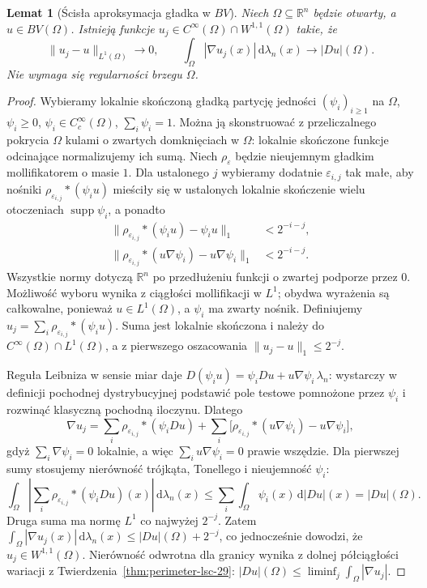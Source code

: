 \documentclass[11pt,a4paper,oneside]{book}
\numberwithin{equation}{chapter}
\theoremstyle{plain}
\newtheorem{lemat}[twierdzenie]{Lemat}
\theoremstyle{definition}
\theoremstyle{remark}
\begin{document}
\begin{lemat}[Ścisła aproksymacja gładka w $BV$]
\label{lem:BV-strict-approx}
Niech $\Omega\subseteq\mathbb R^n$ będzie otwarty,
a $u\in BV(\Omega)$. Istnieją funkcje
$u_j\in C^\infty(\Omega)\cap W^{1,1}(\Omega)$ takie, że
\[
 \|u_j-u\|_{L^1(\Omega)}\longrightarrow0,
 \qquad
 \int_\Omega|\nabla u_j(x)|\,\mathrm d\lambda_n(x)
 \longrightarrow |Du|(\Omega).
\]
Nie wymaga się regularności brzegu $\Omega$.
\end{lemat}
\begin{proof}
Wybieramy lokalnie skończoną gładką partycję
jedności $(\psi_i)_{i\ge1}$ na $\Omega$,
$\psi_i\ge0$, $\psi_i\in C_c^\infty(\Omega)$,
$\sum_i\psi_i=1$. Można ją skonstruować z
przeliczalnego pokrycia $\Omega$ kulami o zwartych
domknięciach w $\Omega$: lokalnie skończone
funkcje odcinające normalizujemy ich sumą.
Niech $\rho_\varepsilon$ będzie nieujemnym
gładkim mollifikatorem o masie $1$.
Dla ustalonego $j$ wybieramy dodatnie
$\varepsilon_{i,j}$ tak małe, aby nośniki
$\rho_{\varepsilon_{i,j}}*(\psi_i u)$ mieściły
się w ustalonych lokalnie skończenie wielu
otoczeniach $\operatorname{supp}\psi_i$,
a ponadto
\begin{align*}
 \|\rho_{\varepsilon_{i,j}}*(\psi_i u)-\psi_i u\|_1
 &<2^{-i-j},\\
 \|\rho_{\varepsilon_{i,j}}*(u\nabla\psi_i)
              -u\nabla\psi_i\|_1
 &<2^{-i-j}.
\end{align*}
Wszystkie normy dotyczą $\mathbb R^n$ po
przedłużeniu funkcji o zwartej podporze przez $0$.
Możliwość wyboru wynika z ciągłości mollifikacji
w $L^1$; obydwa wyrażenia są całkowalne, ponieważ
$u\in L^1(\Omega)$, a $\psi_i$ ma zwarty nośnik.
Definiujemy
$u_j=\sum_i\rho_{\varepsilon_{i,j}}*(\psi_i u)$.
Suma jest lokalnie skończona i należy do
$C^\infty(\Omega)\cap L^1(\Omega)$, a z pierwszego
oszacowania
$\|u_j-u\|_1\le2^{-j}$.

Reguła Leibniza w sensie miar daje
$D(\psi_i u)=\psi_i Du+u\nabla\psi_i\,\lambda_n$:
wystarczy w definicji pochodnej dystrybucyjnej
podstawić pole testowe pomnożone przez $\psi_i$
i rozwinąć klasyczną pochodną iloczynu.
Dlatego
\[
 \nabla u_j
 =\sum_i\rho_{\varepsilon_{i,j}}*(\psi_i Du)
 +\sum_i\bigl[\rho_{\varepsilon_{i,j}}*(u\nabla\psi_i)
                  -u\nabla\psi_i\bigr],
\]
gdyż $\sum_i\nabla\psi_i=0$ lokalnie,
a więc $\sum_i u\nabla\psi_i=0$ prawie wszędzie.
Dla pierwszej sumy stosujemy nierówność trójkąta,
Tonellego i nieujemność $\psi_i$:
\[
 \int_\Omega\left|
 \sum_i\rho_{\varepsilon_{i,j}}*(\psi_i Du)(x)
 \right|\,\mathrm d\lambda_n(x)
 \le\sum_i\int_\Omega\psi_i(x)\,\mathrm d|Du|(x)
 =|Du|(\Omega).
\]
Druga suma ma normę $L^1$ co najwyżej $2^{-j}$.
Zatem $\int_\Omega|\nabla u_j(x)|\,\mathrm d\lambda_n(x)
\le|Du|(\Omega)+2^{-j}$, co jednocześnie dowodzi,
że $u_j\in W^{1,1}(\Omega)$.
Nierówność odwrotna dla granicy wynika z
dolnej półciągłości wariacji z
Twierdzenia~\ref{thm:perimeter-lsc-29}:
$|Du|(\Omega)\le\liminf_j\int_\Omega|\nabla u_j|$.
\end{proof}
\end{document}

